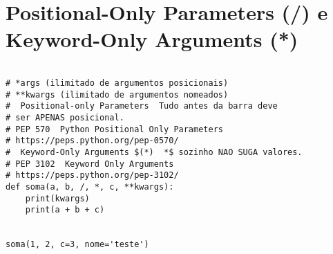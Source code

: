 \documentclass{article}
\begin{document}
\section{  Positional-Only Parameters (/) e Keyword-Only Arguments (*)}

\begin{lstlisting}
   
# *args (ilimitado de argumentos posicionais)
# **kwargs (ilimitado de argumentos nomeados)
#  Positional-only Parameters  Tudo antes da barra deve
# ser APENAS posicional.
# PEP 570  Python Positional Only Parameters
# https://peps.python.org/pep-0570/
#  Keyword-Only Arguments $(*)  *$ sozinho NAO SUGA valores.
# PEP 3102  Keyword Only Arguments
# https://peps.python.org/pep-3102/
def soma(a, b, /, *, c, **kwargs):
    print(kwargs)
    print(a + b + c)


soma(1, 2, c=3, nome='teste')
\end{lstlisting}
\end{document}
